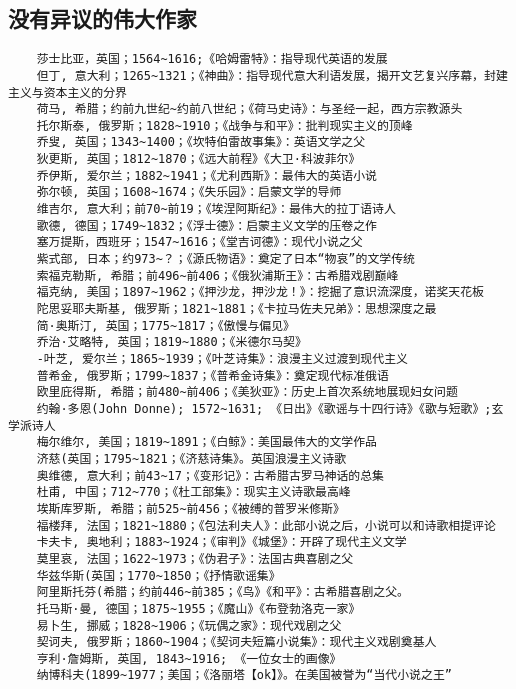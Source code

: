 \documentclass[UTF8]{../RepresentationUniverse}
\begin{document}
\subsection{没有异议的伟大作家}
\begin{lstlisting}
    莎士比亚，英国；1564~1616;《哈姆雷特》：指导现代英语的发展
    但丁, 意大利；1265~1321；《神曲》：指导现代意大利语发展，揭开文艺复兴序幕，封建主义与资本主义的分界
    荷马, 希腊；约前九世纪~约前八世纪；《荷马史诗》：与圣经一起，西方宗教源头
    托尔斯泰, 俄罗斯；1828~1910；《战争与和平》：批判现实主义的顶峰
    乔叟, 英国；1343~1400；《坎特伯雷故事集》：英语文学之父
    狄更斯, 英国；1812~1870；《远大前程》《大卫·科波菲尔》
    乔伊斯, 爱尔兰；1882~1941；《尤利西斯》：最伟大的英语小说
    弥尔顿, 英国；1608~1674；《失乐园》：启蒙文学的导师
    维吉尔, 意大利；前70~前19；《埃涅阿斯纪》：最伟大的拉丁语诗人
    歌德, 德国；1749~1832；《浮士德》：启蒙主义文学的压卷之作
    塞万提斯，西班牙；1547~1616；《堂吉诃德》：现代小说之父
    紫式部, 日本；约973~？；《源氏物语》：奠定了日本“物哀”的文学传统
    索福克勒斯, 希腊；前496~前406；《俄狄浦斯王》：古希腊戏剧巅峰
    福克纳, 美国；1897~1962；《押沙龙，押沙龙！》：挖掘了意识流深度，诺奖天花板
    陀思妥耶夫斯基, 俄罗斯；1821~1881；《卡拉马佐夫兄弟》：思想深度之最
    简·奥斯汀, 英国；1775~1817；《傲慢与偏见》
    乔治·艾略特, 英国；1819~1880；《米德尔马契》
    -叶芝, 爱尔兰；1865~1939；《叶芝诗集》：浪漫主义过渡到现代主义
    普希金, 俄罗斯；1799~1837；《普希金诗集》：奠定现代标准俄语
    欧里庇得斯, 希腊；前480~前406；《美狄亚》：历史上首次系统地展现妇女问题
    约翰·多恩(John Donne); 1572~1631; 《日出》《歌谣与十四行诗》《歌与短歌》;玄学派诗人
    梅尔维尔, 美国；1819~1891；《白鲸》：美国最伟大的文学作品
    济慈(英国；1795~1821；《济慈诗集》。英国浪漫主义诗歌
    奥维德, 意大利；前43~17；《变形记》：古希腊古罗马神话的总集
    杜甫, 中国；712~770；《杜工部集》：现实主义诗歌最高峰
    埃斯库罗斯, 希腊；前525~前456；《被缚的普罗米修斯》
    福楼拜, 法国；1821~1880；《包法利夫人》：此部小说之后，小说可以和诗歌相提评论
    卡夫卡, 奥地利；1883~1924；《审判》《城堡》：开辟了现代主义文学
    莫里哀, 法国；1622~1973；《伪君子》：法国古典喜剧之父
    华兹华斯(英国；1770~1850；《抒情歌谣集》
    阿里斯托芬(希腊；约前446~前385；《鸟》《和平》：古希腊喜剧之父。
    托马斯·曼, 德国；1875~1955；《魔山》《布登勃洛克一家》
    易卜生, 挪威；1828~1906；《玩偶之家》：现代戏剧之父
    契诃夫, 俄罗斯；1860~1904；《契诃夫短篇小说集》：现代主义戏剧奠基人
    亨利·詹姆斯, 英国, 1843~1916; 《一位女士的画像》
    纳博科夫(1899~1977；美国；《洛丽塔【ok】》。在美国被誉为“当代小说之王”

\end{lstlisting}
\end{document}
